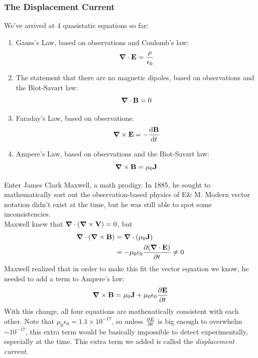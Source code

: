 \documentclass[a4paper]{article}
\begin{document}
\subsubsection{The Displacement Current}
We've arrived at 4 quasistatic equations so far:
\begin{enumerate}
	\item Gauss's Law, based on observations and Coulomb's law:
		\[ \boldsymbol{\mathbf{\nabla}} \cdot \boldsymbol{\mathbf{E}} = \frac{\rho}{\epsilon_0} \]
	\item The statement that there are no magnetic dipoles, based on
		observations and the Biot-Savart law:
		\[ \boldsymbol{\mathbf{\nabla}} \cdot \boldsymbol{\mathbf{B}} = 0 \]
	\item Faraday's Law, based on observations:
		\[ \boldsymbol{\mathbf{\nabla}} \times \boldsymbol{\mathbf{E}} = -\frac{\mathrm{d} \boldsymbol{\mathbf{B}}}{\mathrm{d} t} \]
	\item Ampere's Law, based on observations and the Biot-Savart law:
		\[ \boldsymbol{\mathbf{\nabla}} \times \boldsymbol{\mathbf{B}} = \mu_0 \boldsymbol{\mathbf{J}} \]
\end{enumerate}
Enter James Clark Maxwell, a math prodigy. In 1885, he sought to mathematically
sort out the observation-based physics of E\& M. Modern vector notation didn't
exist at the time, but he was still able to spot some inconsistencies.\\
Maxwell knew that $\boldsymbol{\mathbf{\nabla}}\cdot(\boldsymbol{\mathbf{\nabla}}\times\boldsymbol{\mathbf{V}})=0$, but
\begin{align*}
	\boldsymbol{\mathbf{\nabla}}\cdot(\boldsymbol{\mathbf{\nabla}}\times\boldsymbol{\mathbf{B}}) &= \boldsymbol{\mathbf{\nabla}}\cdot(\mu_0\boldsymbol{\mathbf{J}})\\
	&= -\mu_0\epsilon_0\frac{\partial (\boldsymbol{\mathbf{\nabla}}\cdot\boldsymbol{\mathbf{E}})}{\partial t} \neq 0
\end{align*}
Maxwell realized that in order to make this fit the vector equation we know,
he needed to add a term to Ampere's law:
\[ \boldsymbol{\mathbf{\nabla}} \times \boldsymbol{\mathbf{B}} = \mu_0 \boldsymbol{\mathbf{J}} + \mu_0 \epsilon_0 \frac{\partial \boldsymbol{\mathbf{E}}}{\partial t} \]
With this change, all four equations are mathenatically consistent with each
other. Note that $\mu_0\epsilon_0 = 1.1\times10^{-17}$, so unless
$\frac{\partial E}{\partial t}$ is big enough to overwhelm $\sim10^{-17}$, this extra term would
be basically impossible to detect experimentally, especially at the time.
This extra term we added is called the \emph{displacement current}.
\end{document}
